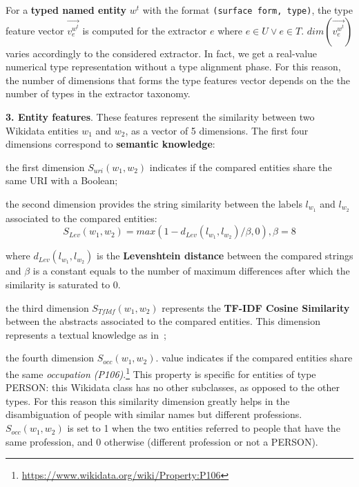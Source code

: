 \documentclass{llncs}
\begin{document}
For a \textbf{typed named entity} $w^t$ with the format \texttt{(surface form, type)}, the type feature vector $\vec{v^{w^t}_{e}}$ is computed for the extractor $e$ where $e \in U \lor e \in T$. $dim(\vec{v^{w^t}_{e}})$ varies accordingly to the considered extractor. In fact, we get a real-value numerical type representation without a type alignment phase. For this reason, the number of dimensions that forms the type features vector depends on the the number of types in the extractor taxonomy.

\textbf{3. Entity features}. These features represent the similarity between two Wikidata entities $w_1$ and $w_2$, as a vector of 5 dimensions. The first four dimensions correspond to \textbf{semantic knowledge}:
\begin{enumerate}
\begin{item}
the first dimension $S_{uri}(w_1,w_2)$ indicates if the compared entities share the same URI with a Boolean; \end{item}
\begin{item}
the second dimension provides the string similarity between the labels $l_{w_1}$ and $l_{w_2}$ associated to the compared entities: 
$$S_{Lev}(w_1,w_2) = max(1-d_{Lev}(l_{w_1},l_{w_2})/\beta,0), \beta = 8$$

where $d_{Lev}(l_{w_1},l_{w_2})$ is the \textbf{Levenshtein distance} between the compared strings and $\beta$ is a constant equals to the number of maximum differences after which the similarity is saturated to 0.
\end{item}
\begin{item}
the third dimension $S_{TfIdf}(w_1,w_2)$ represents the \textbf{TF-IDF Cosine Similarity} between the abstracts associated to the compared entities. This dimension represents a textual knowledge as in~\cite{CollaborativeKnowledgeBaseEmbeddingforRecommenderSystems};
\end{item}
\begin{item}
the fourth dimension $S_{occ}(w_1,w_2)$. value indicates if the compared entities share the same \textit{occupation (P106)}.\footnote{\url{https://www.wikidata.org/wiki/Property:P106}} This property is specific for entities of type PERSON: this Wikidata class has no other subclasses, as opposed to the other types. For this reason this similarity dimension greatly helps in the disambiguation of people with similar names but different professions. $S_{occ}(w_1,w_2)$ is set to 1 when the two entities referred to people that have the same profession, and 0 otherwise (different profession or not a PERSON).
\end{item}
\end{enumerate}
\end{document}
